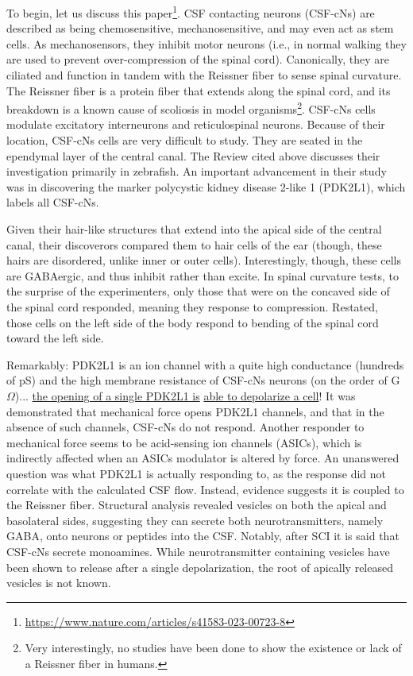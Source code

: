 \documentclass[12pt]{report}
\begin{document}
To begin, let us discuss this paper\footnote{\url{https://www.nature.com/articles/s41583-023-00723-8}}. CSF contacting neurons (CSF-cNs) are described as being chemosensitive, mechanosensitive, and may even act as stem cells. As mechanosensors, they inhibit motor neurons (i.e., in normal walking they are used to prevent over-compression of the spinal cord). Canonically, they are ciliated and function in tandem with the Reissner fiber to sense spinal curvature. The Reissner fiber is a protein fiber that extends along the spinal cord, and its breakdown is a known cause of scoliosis in model organisms\footnote{Very interestingly, no studies have been done to show the existence or lack of a Reissner fiber in humans.}. CSF-cNs cells modulate excitatory interneurons and reticulospinal neurons. Because of their location, CSF-cNs cells are very difficult to study. They are seated in the ependymal layer of the central canal. The Review cited above discusses their investigation primarily in zebrafish. An important advancement in their study was in discovering the marker polycystic kidney disease 2-like 1 (PDK2L1), which labels all CSF-cNs.\newline

Given their hair-like structures that extend into the apical side of the central canal, their discoverors compared them to hair cells of the ear (though, these hairs are disordered, unlike inner or outer cells). Interestingly, though, these cells are GABAergic, and thus inhibit rather than excite. In spinal curvature tests, to the surprise of the experimenters, only those that were on the concaved side of the spinal cord responded, meaning they response to compression. Restated, those cells on the left side of the body respond to bending of the spinal cord toward the left side.\newline 

Remarkably: PDK2L1 is an ion channel with a quite high conductance (hundreds of pS) and the high membrane resistance of CSF-cNs neurons (on the order of G$\Omega$)... \underline{the opening of a single PDK2L1 is}  \underline{able to depolarize a cell}! It was demonstrated that mechanical force opens PDK2L1 channels, and that in the absence of such channels, CSF-cNs do not respond. Another responder to mechanical force seems to be acid-sensing ion channels (ASICs), which is indirectly affected when an ASICs modulator is altered by force. An unanswered question was what PDK2L1 is actually responding to, as the response did not correlate with the calculated CSF flow. Instead, evidence suggests it is coupled to the Reissner fiber. Structural analysis revealed vesicles on both the apical and basolateral sides, suggesting they can secrete both neurotransmitters, namely GABA, onto neurons or peptides into the CSF. Notably, after SCI it is said that CSF-cNs secrete monoamines. While neurotransmitter containing vesicles have been shown to release after a single depolarization, the root of apically released vesicles is not known.\newline
\end{document}
